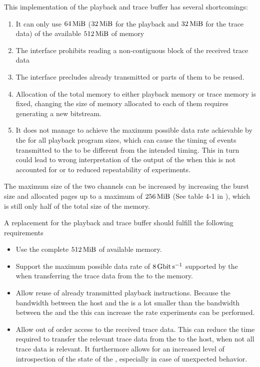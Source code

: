This implementation of the playback and trace buffer has several shortcomings:
\begin{enumerate}
  \item It can only use \(\SI{64}{\mebi\byte}\) (\(\SI{32}{\mebi\byte}\) for the playback and \(\SI{32}{\mebi\byte}\) for the trace data) of the available $\DDRSIZE{}$ of memory\label{point:limited_size}
  \item The \FIFO{} interface prohibits reading a non-contiguous block of the received trace data
  \item The \FIFO{} interface precludes already transmitted \PlaybackProgram{} or parts of them to be reused.
  \item Allocation of the total memory to either playback memory or trace memory is fixed, changing the size of memory allocated to each of them requires generating a new \FPGA{} bitstream.
  \item It does not manage to achieve the maximum possible data rate achievable by the \pbexec{} for all playback program sizes, which can cause the timing of events transmitted to the \ASIC{} to be different from the intended timing. This in turn could lead to wrong interpretation of the output of the \ASIC{} when this is not accounted for or to reduced repeatability of experiments.
\end{enumerate}
The maximum size of the two \VFIFO{} channels can be increased by increasing the burst size and allocated pages up to a maximum of \(\SI{256}{\mebi\byte}\) (See table 4-1 in \autocite{ref:vfifo}), which is still only half of the total size of the memory.

A replacement for the playback and trace buffer should fulfill the following requirements
\begin{itemize}
  \item Use the complete $\DDRSIZE{}$ of available memory.
  \item Support the maximum possible data rate of $\pbExecBandwidth{}$ supported by the \pbexec{} when transferring the trace data from the \pbexec{} to the memory.
  \item Allow reuse of already transmitted playback instructions. Because the bandwidth between the host and the \FPGA{} is a lot smaller than the bandwidth between the \FPGA{} and the \ASIC{} this can increase the rate experiments can be performed.
  \item Allow out of order access to the received trace data. This can reduce the time required to transfer the relevant trace data from the \FPGA{} to the host, when not all trace data is relevant.  It furthermore allows for an increased level of introspection of the state of the \FPGA{}, especially in case of unexpected behavior.
\end{itemize}
